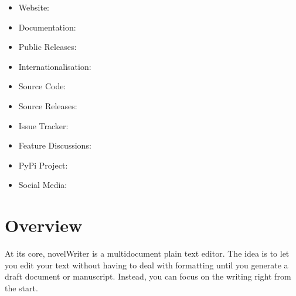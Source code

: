 \documentclass[a4paper,11pt,english]{sphinxmanual}
\begin{document}
\sphinxAtStartPar
{}
\begin{itemize}
\item {} 
\sphinxAtStartPar
Website: 

\item {} 
\sphinxAtStartPar
Documentation: 

\item {} 
\sphinxAtStartPar
Public Releases: 

\item {} 
\sphinxAtStartPar
Internationalisation: 

\item {} 
\sphinxAtStartPar
Source Code: 

\item {} 
\sphinxAtStartPar
Source Releases: 

\item {} 
\sphinxAtStartPar
Issue Tracker: 

\item {} 
\sphinxAtStartPar
Feature Discussions: 

\item {} 
\sphinxAtStartPar
PyPi Project: 

\item {} 
\sphinxAtStartPar
Social Media: 

\end{itemize}

\sphinxstepscope


\chapter{Overview}
\label{\detokenize{int_introduction:overview}}\label{\detokenize{int_introduction:a-intro}}\label{\detokenize{int_introduction::doc}}
\sphinxAtStartPar
At its core, novelWriter is a multi\sphinxhyphen{}document plain text editor. The idea is to let you edit your
text without having to deal with formatting until you generate a draft document or manuscript.
Instead, you can focus on the writing right from the start.
\end{document}
